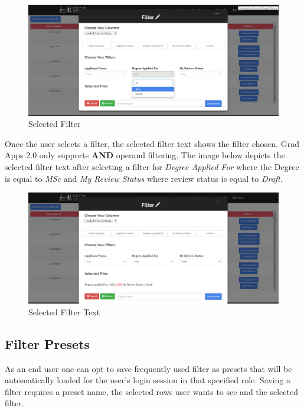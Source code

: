\documentclass[fontsize=12pt,paper=letter,twoside]{scrartcl}
\begin{document}
\clearpage
\begin{figure}[!htb]
\begin{center}
\includegraphics[width=.9\textwidth]{images/selected_filter.png}
\end{center}
\caption{Selected Filter}
\label{fig:fm_selected_filter}
\end{figure}

\bigskip
\noindent Once the user selects a filter, the selected filter text shows the filter chosen. Grad Apps 2.0 only supports \textbf{AND} operand filtering. The image below depicts the selected filter text after selecting a filter for \emph{Degree Applied For} where the Degree is equal to \emph{MSc} and \emph{My Review Status} where review status is equal to \emph{Draft}.

\begin{figure}[!htb]
\begin{center}
\includegraphics[width=.9\textwidth]{images/selected_filter_text.png}
\end{center}
\caption{Selected Filter Text}
\label{fig:fm_selected_filter_txt}
\end{figure}

\subsection{Filter Presets}
As an end user one can opt to save frequently used filter as presets that will be automatically loaded for the user's login session in that specified role. Saving a filter requires a preset name, the selected rows user wants to see and the selected filter. 
\end{document}
